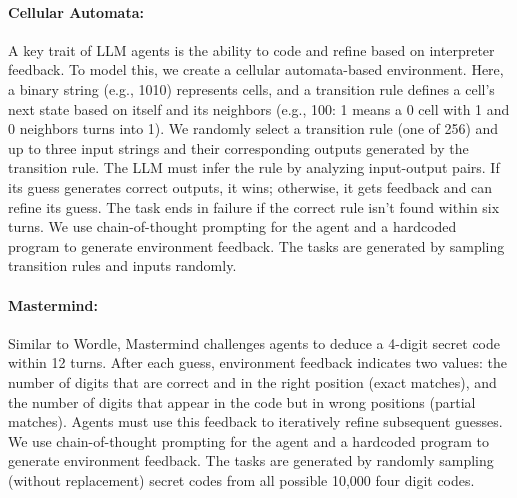 \paragraph{Cellular Automata: } A key trait of LLM agents is the ability to code and refine based on interpreter feedback. To model this, we create a cellular automata-based environment. Here, a binary string (e.g., 1010) represents cells, and a transition rule defines a cell’s next state based on itself and its neighbors (e.g., 100: 1 means a 0 cell with 1 and 0 neighbors turns into 1). We randomly select a transition rule (one of 256) and up to three input strings and their corresponding outputs generated by the transition rule. The LLM must infer the rule by analyzing input-output pairs. If its guess generates correct outputs, it wins; otherwise, it gets feedback and can refine its guess. The task ends in failure if the correct rule isn’t found within six turns. We use chain-of-thought prompting for the agent and a hardcoded program to generate environment feedback. The tasks are generated by sampling transition rules and inputs randomly.

\paragraph{Mastermind: } Similar to Wordle, Mastermind challenges agents to deduce a 4-digit secret code within 12 turns. After each guess, environment feedback indicates two values: the number of digits that are correct and in the right position (exact matches), and the number of digits that appear in the code but in wrong positions (partial matches). Agents must use this feedback to iteratively refine subsequent guesses. We use chain-of-thought prompting for the agent and a hardcoded program to generate environment feedback. The tasks are generated by randomly sampling (without replacement) secret codes from all possible 10,000 four digit codes.

